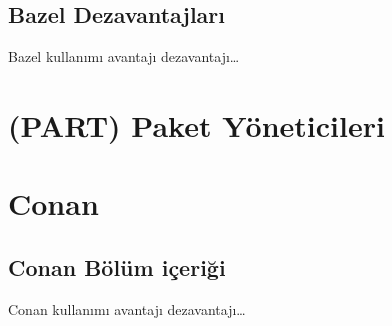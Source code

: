 \documentclass[
]{book}
\begin{document}
\hypertarget{bazel-dezavantajlarux131}{%
\section{Bazel Dezavantajları}\label{bazel-dezavantajlarux131}}

Bazel kullanımı avantajı dezavantajı\ldots{}

\hypertarget{part-paket-yuxf6neticileri}{%
\chapter{(PART) Paket Yöneticileri}\label{part-paket-yuxf6neticileri}}

\hypertarget{conan}{%
\chapter{Conan}\label{conan}}

\hypertarget{conan-buxf6luxfcm-iuxe7eriux11fi}{%
\section{Conan Bölüm içeriği}\label{conan-buxf6luxfcm-iuxe7eriux11fi}}

Conan kullanımı avantajı dezavantajı\ldots{}
\end{document}

